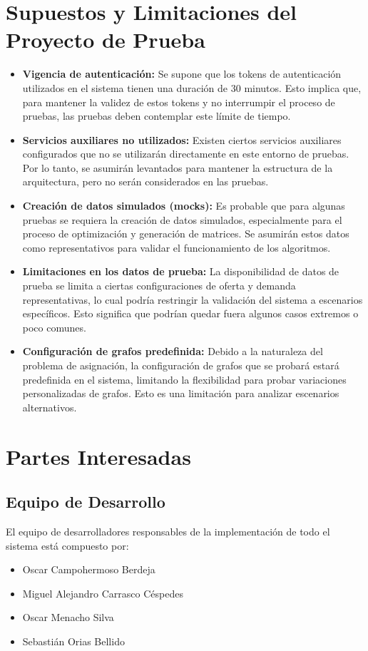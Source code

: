 \documentclass[stu, 12pt, letterpaper, donotrepeattitle, floatsintext, natbib]{apa7}
\begin{document}
\section{\large Supuestos y Limitaciones del Proyecto de Prueba}

\begin{itemize}
    \item \textbf{Vigencia de autenticación:} Se supone que los tokens de autenticación utilizados en el sistema tienen una duración de 30 minutos. Esto implica que, para mantener la validez de estos tokens y no interrumpir el proceso de pruebas, las pruebas deben contemplar este límite de tiempo.
    
    \item \textbf{Servicios auxiliares no utilizados:} Existen ciertos servicios auxiliares configurados que no se utilizarán directamente en este entorno de pruebas. Por lo tanto, se asumirán levantados para mantener la estructura de la arquitectura, pero no serán considerados en las pruebas.
    
    \item \textbf{Creación de datos simulados (mocks):} Es probable que para algunas pruebas se requiera la creación de datos simulados, especialmente para el proceso de optimización y generación de matrices. Se asumirán estos datos como representativos para validar el funcionamiento de los algoritmos.

    \item \textbf{Limitaciones en los datos de prueba:} La disponibilidad de datos de prueba se limita a ciertas configuraciones de oferta y demanda representativas, lo cual podría restringir la validación del sistema a escenarios específicos. Esto significa que podrían quedar fuera algunos casos extremos o poco comunes.
    
    \item \textbf{Configuración de grafos predefinida:} Debido a la naturaleza del problema de asignación, la configuración de grafos que se probará estará predefinida en el sistema, limitando la flexibilidad para probar variaciones personalizadas de grafos. Esto es una limitación para analizar escenarios alternativos.
\end{itemize}

\section{\large Partes Interesadas}

\subsection{Equipo de Desarrollo} 
El equipo de desarrolladores responsables de la implementación de todo el sistema está compuesto por:
    \begin{itemize}
        \item Oscar Campohermoso Berdeja
        \item Miguel Alejandro Carrasco Céspedes
        \item Oscar Menacho Silva
        \item Sebastián Orias Bellido
    \end{itemize}
\end{document}
